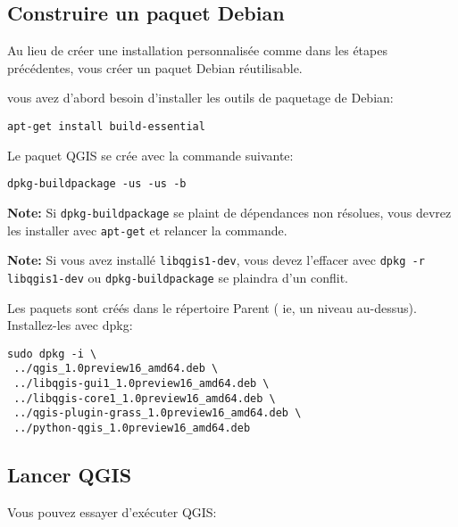 \subsection{Construire un paquet Debian}
Au lieu de cr\'eer une installation personnalis\'ee comme dans les \'etapes pr\'ec\'edentes, vous cr\'eer un paquet Debian r\'eutilisable.

vous avez d'abord besoin d'installer les outils de paquetage de Debian:

\begin{verbatim}
apt-get install build-essential
\end{verbatim}

Le paquet QGIS se cr\'ee avec la commande suivante:

\begin{verbatim}
dpkg-buildpackage -us -us -b
\end{verbatim}

\textbf{Note:} Si \texttt{dpkg-buildpackage} se plaint de d\'ependances non r\'esolues, vous devrez les installer avec \texttt{apt-get} et relancer la commande.

\textbf{Note:} Si vous avez install\'e \texttt{libqgis1-dev}, vous devez l'effacer avec \texttt{dpkg -r libqgis1-dev} ou \texttt{dpkg-buildpackage} se plaindra d'un conflit.

Les paquets sont cr\'e\'es dans le r\'epertoire Parent ( ie, un niveau au-dessus).
Installez-les avec dpkg:

\begin{verbatim}
sudo dpkg -i \
 ../qgis_1.0preview16_amd64.deb \
 ../libqgis-gui1_1.0preview16_amd64.deb \
 ../libqgis-core1_1.0preview16_amd64.deb \
 ../qgis-plugin-grass_1.0preview16_amd64.deb \
 ../python-qgis_1.0preview16_amd64.deb
\end{verbatim}

% 
% 

\subsection{Lancer QGIS}
Vous pouvez essayer d'ex\'ecuter QGIS:

